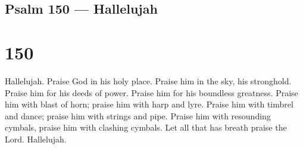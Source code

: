\hypertarget{psalm-150-hallelujah}{%
\subsection{Psalm 150 --- Hallelujah}\label{psalm-150-hallelujah}}

\hypertarget{section-149}{%
\section{150}\label{section-149}}

 Hallelujah. Praise God in his holy place. Praise him in the
sky, his stronghold.  Praise him for his deeds of power.
Praise him for his boundless greatness.  Praise him with
blast of horn; praise him with harp and lyre.  Praise him
with timbrel and dance; praise him with strings and pipe. 
Praise him with resounding cymbals, praise him with clashing cymbals.
 Let all that has breath praise the Lord. Hallelujah.
